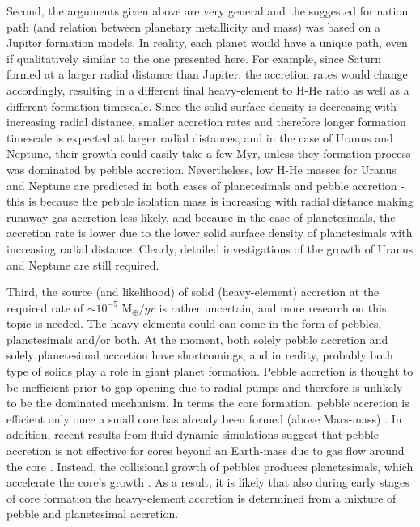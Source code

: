 \documentclass{aa}
\begin{document}
{Second, the arguments given above are very general and the suggested formation path (and relation between planetary metallicity and mass) was based on a Jupiter formation models. 
In reality, each planet would have a unique path, even if qualitatively similar to the one presented here. For example, since Saturn formed at a larger radial distance than Jupiter, the accretion rates would change accordingly, resulting in a different final heavy-element to H-He ratio as well as a different formation timescale. Since the solid surface density is decreasing with increasing radial distance, smaller accretion rates and therefore longer formation timescale is expected at larger radial distances, and in the case of Uranus and Neptune, their growth could easily take a few Myr, unless they  formation process was dominated by pebble accretion. 
Nevertheless, low H-He masses for  Uranus and Neptune are predicted in both cases of planetesimals and pebble accretion - this is because the pebble isolation mass is increasing with radial distance making runaway gas accretion less likely, and because in the case of planetesimals, the accretion rate is lower due to the lower solid surface density of planetesimals with increasing radial distance. Clearly, detailed investigations of the growth of Uranus and Neptune are still required.  

Third, the source (and likelihood) of solid (heavy-element) accretion at the required rate of  $\sim10^{-5}$ M$_{\oplus}/yr$ is rather uncertain, and more research on this topic is needed. The heavy elements could can come in the form of pebbles, planetesimals and/or both. At the moment, both solely pebble accretion and solely planetesimal accretion have shortcomings, and in reality, probably both type of solids play a role in giant planet formation.  
Pebble accretion is thought to be inefficient  prior to gap opening due to radial pumps \citep[e.g.,][]{2018A&A...612A..30B} and therefore is unlikely to be the dominated mechanism. 
In terms the core formation, pebble accretion is efficient only once a small core has already been formed (above Mars-mass) \citep[e.g.,][]{2010A&A...520A..43O}. 
In addition, recent results from fluid-dynamic simulations suggest that pebble accretion is not effective for cores beyond an Earth-mass due to gas flow around the core \citep{2021ApJ...916..109O}. 
Instead, the collisional growth of pebbles produces planetesimals, which accelerate the core's growth \citep{2021ApJ...922...16K}. As a result, it is likely that also during early stages of core formation the heavy-element accretion is determined from a mixture of pebble and planetesimal accretion.  
\par 

}
\end{document}
